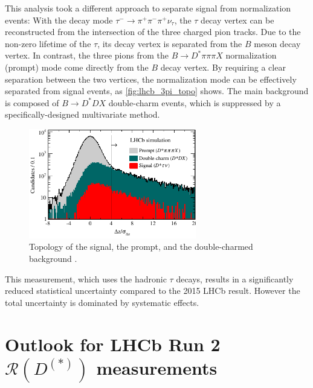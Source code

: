 \documentclass[12pt,letterpaper]{article}
\newcommand{\PRLrule}{
    \bigskip
    \noindent\makebox[\linewidth]{
        \resizebox{0.3333\linewidth}{1pt}{$\blacklozenge$}
    }
    \bigskip
}
\def\RDDst/{\ensuremath{\mathcal{R}(D^{(*)})}}
\begin{document}
This analysis took a different approach to separate signal from normalization events:
With the decay mode $\tau^- \rightarrow \pi^+ \pi^- \pi^+ \nu_\tau$,
the $\tau$ decay vertex can be reconstructed from the intersection of the three charged pion tracks.
Due to the non-zero lifetime of the $\tau$, its decay vertex is
separated from the $B$ meson decay vertex.
In contrast, the three pions from the $B \rightarrow D^* \pi \pi \pi X$ normalization (prompt) mode come directly from the $B$ decay vertex.
By requiring a clear separation between the two vertices, the normalization mode can be effectively separated from signal events, as \autoref{fig:lhcb_3pi_topo} shows.
The main background is composed of $B \rightarrow D^* D X$ double-charm events, which is suppressed by a specifically-designed multivariate method.

\begin{figure}[ht]
    \centering
    \includegraphics[width=0.65\textwidth]{figs/lhcb_3pi_topo.pdf}
    \caption{
        Topology of the signal, the prompt, and the double-charmed background \cite{Aaij:2017deq}.
    }
    \label{fig:lhcb_3pi_topo}
\end{figure}

This measurement, which uses the hadronic $\tau$ decays, results in a significantly reduced statistical uncertainty compared to the 2015 LHCb result. However the total uncertainty is dominated by systematic effects.

\section{Outlook for LHCb Run 2 \RDDst/ measurements}



\PRLrule
\printbibliography
\end{document}
